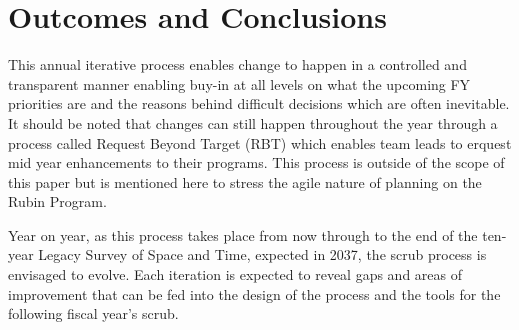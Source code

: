 \section{Outcomes and Conclusions} \label{sec:outcomes}

This annual iterative process enables change to happen in a controlled and transparent manner enabling buy-in at all levels on what the upcoming FY priorities are and the reasons behind difficult decisions which are often inevitable. It should be noted that changes can still happen throughout the year through a process called Request Beyond Target (RBT) which enables team leads to erquest mid year enhancements to their programs. This process is outside of the scope of this paper but is mentioned here to stress the agile nature of planning on the Rubin Program.

Year on year, as this process takes place from now through to the end of the ten-year Legacy Survey of Space and Time, expected in 2037, the scrub process is envisaged to evolve. Each iteration is expected to reveal gaps and areas of improvement that can be fed into the design of the process and the tools for the following fiscal year’s scrub.
